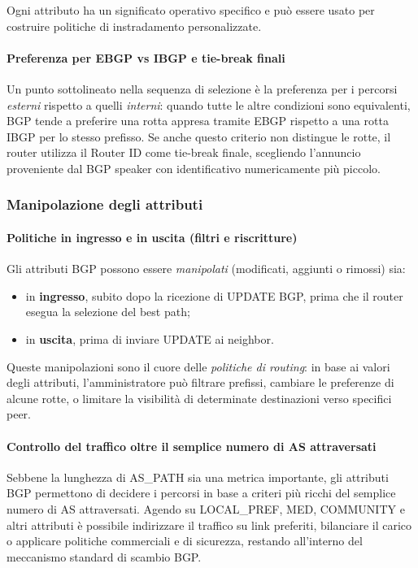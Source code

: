 Ogni attributo ha un significato operativo specifico e può essere usato per costruire politiche di instradamento personalizzate.

\paragraph{Preferenza per EBGP vs IBGP e tie-break finali}

Un punto sottolineato nella sequenza di selezione è la preferenza per i percorsi \emph{esterni} rispetto a quelli \emph{interni}: quando tutte le altre condizioni sono equivalenti, BGP tende a preferire una rotta appresa tramite EBGP rispetto a una rotta IBGP per lo stesso prefisso. Se anche questo criterio non distingue le rotte, il router utilizza il Router ID come tie-break finale, scegliendo l’annuncio proveniente dal BGP speaker con identificativo numericamente più piccolo.

\subsubsection{Manipolazione degli attributi}

\paragraph{Politiche in ingresso e in uscita (filtri e riscritture)}

Gli attributi BGP possono essere \emph{manipolati} (modificati, aggiunti o rimossi) sia:
\begin{itemize}
    \item in \textbf{ingresso}, subito dopo la ricezione di UPDATE BGP, prima che il router esegua la selezione del best path;
    \item in \textbf{uscita}, prima di inviare UPDATE ai neighbor.
\end{itemize}

Queste manipolazioni sono il cuore delle \emph{politiche di routing}: in base ai valori degli attributi, l’amministratore può filtrare prefissi, cambiare le preferenze di alcune rotte, o limitare la visibilità di determinate destinazioni verso specifici peer.

\paragraph{Controllo del traffico oltre il semplice numero di AS attraversati}

Sebbene la lunghezza di AS\_PATH sia una metrica importante, gli attributi BGP permettono di decidere i percorsi in base a criteri più ricchi del semplice numero di AS attraversati. Agendo su LOCAL\_PREF, MED, COMMUNITY e altri attributi è possibile indirizzare il traffico su link preferiti, bilanciare il carico o applicare politiche commerciali e di sicurezza, restando all’interno del meccanismo standard di scambio BGP.

